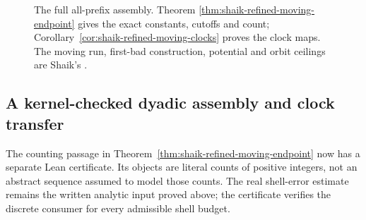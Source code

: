 \documentclass[11pt]{article}
\theoremstyle{remark}\newtheorem{remark}[proposition]{Remark}
\begin{document}
\begin{figure}[ht]
\centering
{}
\caption{The full all-prefix assembly. Theorem
\ref{thm:shaik-refined-moving-endpoint} gives the exact constants,
cutoffs and count; Corollary~\ref{cor:shaik-refined-moving-clocks}
proves the clock maps. The moving run, first-bad construction,
potential and orbit ceilings are Shaik's \cite{Shaik2026v324}.}
\end{figure}

\subsection{A kernel-checked dyadic assembly and clock transfer}

The counting passage in Theorem~\ref{thm:shaik-refined-moving-endpoint}
now has a separate Lean certificate. Its objects are literal counts of
positive integers, not an abstract sequence assumed to model those counts.
The real shell-error estimate remains the written analytic input proved
above; the certificate verifies the discrete consumer for every admissible
shell budget.
\end{document}
